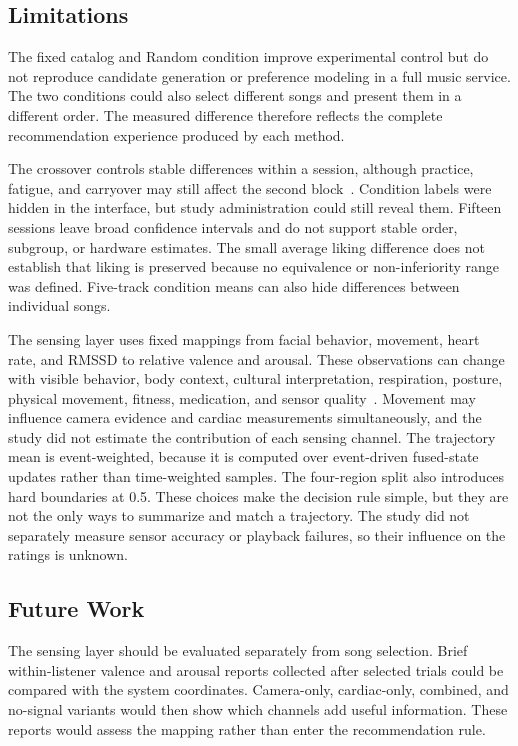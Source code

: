 \subsection{Limitations}

The fixed catalog and Random condition improve experimental control but do not
reproduce candidate generation or preference modeling in a full music service.
The two conditions could also select different songs and present them in a
different order. The measured difference therefore reflects the complete
recommendation experience produced by each method.

The crossover controls stable differences within a session, although practice,
fatigue, and carryover may still affect the second block~\cite{greenwald1976}.
Condition labels were hidden in the interface, but study administration could
still reveal them. Fifteen sessions leave broad confidence intervals and do not
support stable order, subgroup, or hardware estimates. The small average liking
difference does not establish that liking is preserved because no equivalence
or non-inferiority range was defined. Five-track condition means can also hide
differences between individual songs.

The sensing layer uses fixed mappings from facial behavior, movement, heart
rate, and RMSSD to relative valence and arousal. These observations can change
with visible behavior, body context, cultural interpretation, respiration,
posture, physical movement, fitness, medication, and sensor quality~\cite{aviezer2012,barrett2019,kuppens2017,
laborde2017,quigley2024,shaffer2017}. Movement may influence camera evidence
and cardiac measurements simultaneously, and the study did not estimate the
contribution of each sensing channel. The trajectory mean is event-weighted,
because it is computed over event-driven fused-state updates rather than
time-weighted samples. The four-region split also introduces hard boundaries at
0.5. These choices make the decision rule simple, but they are not the only
ways to summarize and match a trajectory. The study did not separately measure
sensor accuracy or playback failures, so their influence on the ratings is
unknown.

\subsection{Future Work}

The sensing layer should be evaluated separately from song selection. Brief
within-listener valence and arousal reports collected after selected trials
could be compared with the system coordinates. Camera-only, cardiac-only,
combined, and no-signal variants would then show which channels add useful
information. These reports would assess the mapping rather than enter the
recommendation rule.

